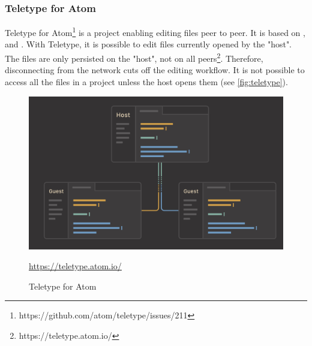 \subsubsection{Teletype for Atom}
Teletype for Atom\footnote{https://github.com/atom/teletype/issues/211} is a project enabling editing files peer to peer. It is based on \cite{Oster:2006:DataconsistencyforP2Pcollaborativeediting}, \cite{YuWeihai:2014} and \cite{BriotUrsoShapiro:2016:HighResponsivenessGroupEditing}.
With Teletype, it is possible to edit files currently opened by the "host". The files are only persisted on the "host", not on all peers\footnote{https://teletype.atom.io/}.
Therefore, disconnecting from the network cuts off the editing workflow. It is not possible to access all the files in a project unless the host opens them (see \autoref{fig:teletype}). 
\begin{figure}[hb]
    \centering
    \includegraphics[width=1\linewidth]{figures/screenshots/teletype.png}
	\caption{Teletype for Atom}
	\href{https://teletype.atom.io/}{https://teletype.atom.io/}
    \label{fig:teletype}
\end{figure}

